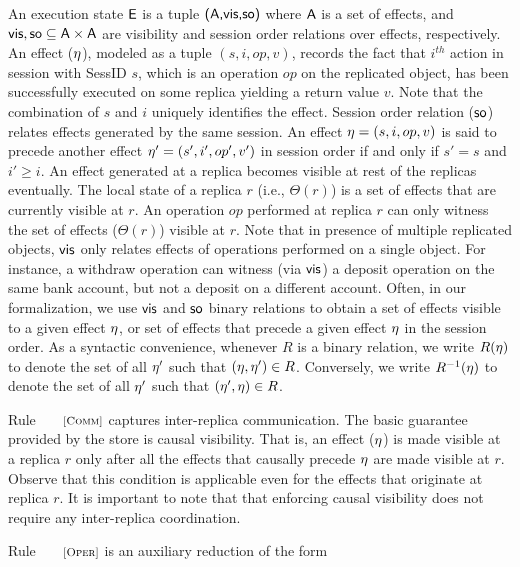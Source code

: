 An execution state ${\normalfont \textsf{E}}$ is a tuple ${\normalfont \textsf{({\normalfont \textsf{A}},\allowbreak {\normalfont \textsf{vis}},\allowbreak {\normalfont \textsf{so}})}}$ where ${\normalfont \textsf{A}}$ is a set
of effects, and ${\normalfont \textsf{vis}},{\normalfont \textsf{so}} \subseteq {\normalfont \textsf{A}} \times
{\normalfont \textsf{A}}$ are visibility and session order relations over effects,
respectively. An effect ($\eta$), modeled as a tuple $(s,i,op,v)$,
records the fact that $i^{th}$ action in session with {\sf SessID}
$s$, which is an operation $op$ on the replicated object, has been
successfully executed on some replica yielding a return value $v$.
Note that the combination of $s$ and $i$ uniquely identifies the
effect. Session order relation (${\normalfont \textsf{so}}$) relates effects generated by
the same session. An effect $\eta = (s,i,op,v)$ is said to precede
another effect $\eta' = (s',i',op',v')$ in session order if and only
if $s'=s$ and $i'\ge i$. An effect generated at a replica becomes
visible at rest of the replicas eventually. The local state of a
replica $r$ (i.e., $\Theta(r)$) is a set of effects that are currently
visible at $r$. An operation $op$ performed at replica $r$ can only
witness the set of effects ($\Theta(r)$) visible at $r$.  Note that
in presence of multiple replicated objects, ${\normalfont \textsf{vis}}$ only relates
effects of operations performed on a single object. For instance, a
{\sf withdraw} operation can witness (via ${\normalfont \textsf{vis}}$) a {\sf deposit}
operation on the same bank account, but not a {\sf deposit} on a
different account. Often, in our formalization, we use ${\normalfont \textsf{vis}}$ and
${\normalfont \textsf{so}}$ binary relations to obtain a set of effects visible to a given
effect $\eta$, or set of effects that precede a given effect $\eta$ in
the session order. As a syntactic convenience, whenever $R$ is a
binary relation, we write $R(\eta)$ to denote the set of all $\eta'$
such that $(\eta,\eta') \in R$.  Conversely, we write $R^{-1}(\eta)$
to denote the set of all $\eta'$ such that $(\eta',\eta) \in R$.  

Rule $\rulelabel{Comm}$ captures inter-replica communication. The
basic guarantee provided by the store is causal visibility. That is,
an effect ($\eta$) is made visible at a replica $r$ only after all
the effects that causally precede $\eta$ are made visible at $r$.
Observe that this condition is applicable even for the effects that
originate at replica $r$. 
It is important to note that that enforcing causal visibility does not
require any inter-replica coordination.

Rule $\rulelabel{Oper}$ is an auxiliary reduction of the form

